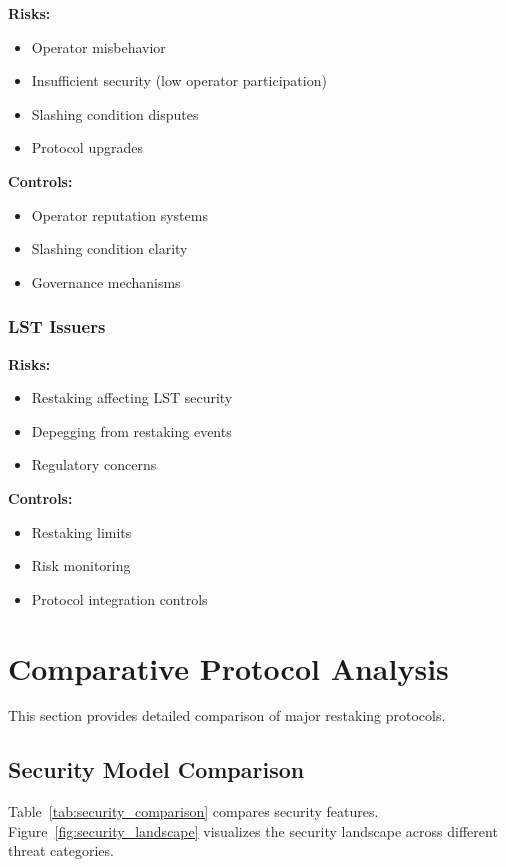 \documentclass[runningheads]{llncs}
\begin{document}
\textbf{Risks:}
\begin{itemize}
    \item Operator misbehavior
    \item Insufficient security (low operator participation)
    \item Slashing condition disputes
    \item Protocol upgrades
\end{itemize}

\textbf{Controls:}
\begin{itemize}
    \item Operator reputation systems
    \item Slashing condition clarity
    \item Governance mechanisms
\end{itemize}

\subsubsection{LST Issuers}

\textbf{Risks:}
\begin{itemize}
    \item Restaking affecting LST security
    \item Depegging from restaking events
    \item Regulatory concerns
\end{itemize}

\textbf{Controls:}
\begin{itemize}
    \item Restaking limits
    \item Risk monitoring
    \item Protocol integration controls
\end{itemize}

\vspace{-0.3cm}
\section{Comparative Protocol Analysis}
\label{sec:comparison}

This section provides detailed comparison of major restaking protocols.

\subsection{Security Model Comparison}

Table~\ref{tab:security_comparison} compares security features. Figure~\ref{fig:security_landscape} visualizes the security landscape across different threat categories.
\end{document}

